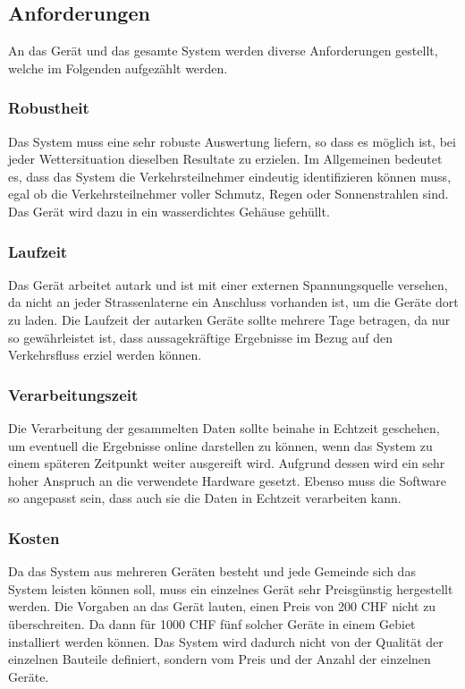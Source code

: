 \subsection{Anforderungen}
An das Gerät und das gesamte System werden diverse Anforderungen gestellt, welche im Folgenden aufgezählt werden.

\subsubsection{Robustheit}
Das System muss eine sehr robuste Auswertung liefern, so dass es möglich ist, bei jeder Wettersituation dieselben Resultate zu erzielen. Im Allgemeinen bedeutet es, dass das System die Verkehrsteilnehmer eindeutig identifizieren können muss, egal ob die Verkehrsteilnehmer voller Schmutz, Regen oder Sonnenstrahlen sind. Das Gerät wird dazu in ein wasserdichtes Gehäuse gehüllt. 

\subsubsection{Laufzeit}
Das Gerät arbeitet autark und ist mit einer externen Spannungsquelle versehen, da nicht an jeder Strassenlaterne ein Anschluss vorhanden ist, um die Geräte dort zu laden. Die Laufzeit der autarken Geräte sollte mehrere Tage betragen, da nur so gewährleistet ist, dass aussagekräftige Ergebnisse im Bezug auf den Verkehrsfluss erziel werden können.  

\subsubsection{Verarbeitungszeit}
Die Verarbeitung der gesammelten Daten sollte beinahe in Echtzeit geschehen, um eventuell die Ergebnisse online darstellen zu können, wenn das System zu einem späteren Zeitpunkt weiter ausgereift wird. Aufgrund dessen wird ein sehr hoher Anspruch an die verwendete Hardware gesetzt. Ebenso muss die Software so angepasst sein, dass auch sie die Daten in Echtzeit verarbeiten kann.

\subsubsection{Kosten}
Da das System aus mehreren Geräten besteht und jede Gemeinde sich das System leisten können soll, muss ein einzelnes Gerät sehr Preisgünstig hergestellt werden. Die Vorgaben an das Gerät lauten, einen Preis von 200 CHF nicht zu überschreiten. Da dann für 1000 CHF fünf solcher Geräte in einem Gebiet installiert werden können. Das System wird dadurch nicht von der Qualität der einzelnen Bauteile definiert, sondern vom Preis und der Anzahl der einzelnen Geräte.
